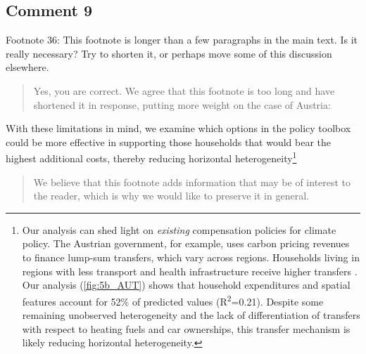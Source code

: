 \documentclass[11pt]{article}
\newenvironment{response}
{\begin{quote}\color{black}}
{\end{quote}}
\begin{document}

\subsection*{Comment 9}\label{comment_R2_9}

\begin{commentbox}
    Footnote 36: This footnote is longer than a few paragraphs in the main text. Is it really necessary? Try to shorten it, or perhaps move some of this discussion elsewhere.
\end{commentbox}

\begin{response}
    Yes, you are correct. We agree that this footnote is too long and have shortened it in response, putting more weight on the case of Austria:
\end{response}

\begin{revisionbox}
    With these limitations in mind, we examine which options in the policy toolbox could be more effective in supporting those households that would bear the highest additional costs, thereby reducing horizontal heterogeneity\footnote{Our analysis can shed light on \textit{existing} compensation policies for climate policy. The Austrian government, for example, uses carbon pricing revenues to finance lump-sum transfers, which vary across regions. Households living in regions with less transport and health infrastructure receive higher transfers \autocite{BMK.2023}. Our analysis (\ref{fig:5b_AUT}) shows that household expenditures and spatial features account for 52\% of predicted values (R\textsuperscript{2}=0.21). Despite some remaining unobserved heterogeneity and the lack of differentiation of transfers with respect to heating fuels and car ownerships, this transfer mechanism is likely reducing horizontal heterogeneity.}
\end{revisionbox}

\begin{response}
    We believe that this footnote adds information that may be of interest to the reader, which is why we would like to preserve it in general.
\end{response}
    
\end{document}
